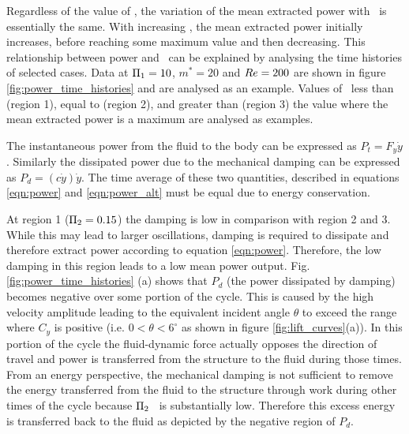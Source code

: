Regardless of the value of \massstiff, the variation of the mean extracted power with \massdamp\ is essentially the same. With increasing \massdamp, the mean extracted power initially increases, before reaching some maximum value and then decreasing. This relationship between power and \massdamp\ can be explained by analysing the time histories of selected cases. Data at $\Pi_1=10$, $m^*=20$ and $Re=200$ are shown in figure \ref{fig:power_time_histories} and are analysed as an example. Values of \massdamp\ less than (region 1), equal to (region 2), and greater than (region 3) the value where the mean extracted power is a maximum are analysed as examples.



The instantaneous power from the fluid to the body can be expressed as $P_t=F_y\dot{y}$. Similarly the dissipated power due to the mechanical damping can be expressed as $P_d=(c\dot{y})\dot{y}$. The time average of these two quantities, described in equations \ref{eqn:power} and \ref{eqn:power_alt} must be equal due to energy conservation.



At region 1 ($\Pi_2=0.15$) the damping is low in comparison with region 2 and 3. While this may lead to larger oscillations, damping is required to dissipate and therefore extract power according to equation \ref{eqn:power}. Therefore, the low damping in this region leads to a low mean power output. Fig.\ref{fig:power_time_histories} (a) shows that $P_d$ (the power dissipated by damping) becomes negative over some portion of the cycle. This is caused by the high velocity amplitude leading to the equivalent incident angle $\theta$ to exceed the range where $C_y$ is positive (i.e. $0<\theta<6^\circ$ as shown in figure \ref{fig:lift_curves}(a)). In this portion of the cycle the fluid-dynamic force actually opposes the direction of travel and power is transferred from the structure to the fluid during those times. From an energy perspective, the mechanical damping is not sufficient to remove the energy transferred from the fluid to the structure through work during other times of the cycle because $\Pi_2$ \ is substantially low. Therefore this excess energy is transferred back to the fluid as depicted by the negative region of $P_d$.


